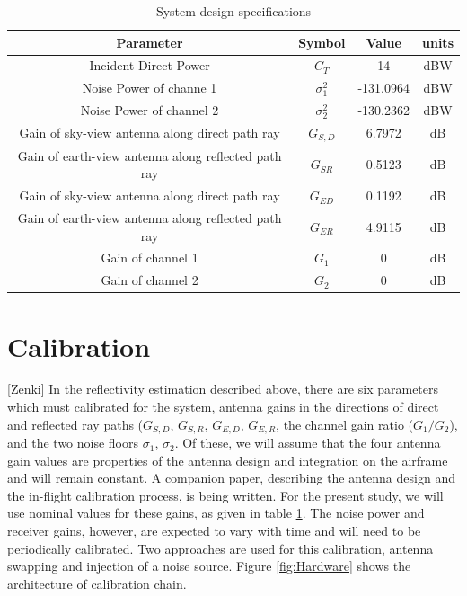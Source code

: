 \documentclass[draftcls,onecolumn]{IEEEtran}  %
\begin{document}
\begin{table}[ht]
\centering
\caption{System design specifications}
\begin{tabular}  {|c|c|c|c|}
	\hline
     \textbf{Parameter} & \textbf{Symbol}	& \textbf{Value} &	\textbf{units}  \\
     \hline
     Incident Direct Power &	$C_T$ & 14  & 	dBW	\\
          \hline
     Noise Power of channe 1&	 $\sigma_1^2$ & -131.0964  & 	dBW	\\
     \hline
      Noise Power of channel 2&	$\sigma_2^2$ & -130.2362  & 	dBW	\\
     \hline
     Gain of sky-view antenna along direct path ray &	$G_{S,D}$ & 6.7972  & 	dB	\\
    \hline
         Gain of earth-view antenna along reflected path ray&	$G_{SR}$ & 0.5123  & 	dB	\\
    \hline
         Gain of sky-view antenna along direct path ray &	$G_{ED}$ & 0.1192  & 	dB	\\
    \hline
             Gain of earth-view antenna along reflected path ray &	$G_{ER}$ & 4.9115  & 	dB	\\
    \hline
    Gain of channel 1 &	$G_1$ & 0  & 	dB	\\
    \hline
    Gain of channel 2 &	$G_2$ & 0  & 	dB	\\
    \hline
\end{tabular}
\label{tab:sysparam}
\end{table}

\section{Calibration}
[Zenki]
\label{sec:calibration}
In the reflectivity estimation described above, there are six parameters which must calibrated for the system, antenna gains in the directions of direct and reflected ray paths ($G_{S,D}$, $G_{S,R}$, $G_{E,D}$, $G_{E,R}$, the channel gain ratio ($G_1/G_2$), and the two noise floors $\sigma_1$, $\sigma_2$. 
Of these, we will assume that the four antenna gain values are properties of the antenna design and integration on the airframe and will remain constant. 
A companion paper, describing the antenna design and the in-flight calibration process, is being written.  
For the present study, we will use nominal values for these gains, as given in table \ref{tab:sysparam}.
The noise power and receiver gains, however, are expected to vary with time and will need to be periodically calibrated. 
Two approaches are used for this calibration, antenna swapping and injection of a noise source. 
Figure \ref{fig:Hardware} shows the architecture of calibration chain.
\end{document}
